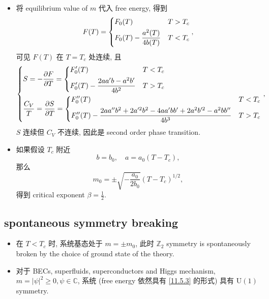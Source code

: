 \begin{itemize}
	\item 将 equilibrium value of $m$ 代入 free energy, 得到
	\begin{equation}
		F(T) = \begin{dcases}
			F_0(T) & T > T_c \\
			F_0(T) - \frac{a^2(T)}{4 b(T)} & T < T_c
		\end{dcases},
	\end{equation}
	可见 $F(T)$ 在 $T = T_c$ 处连续, 且
	\begin{equation}
		\begin{dcases}
			S = - \frac{\partial F}{\partial T} = \begin{dcases}
				F_0'(T) & T < T_c \\
				F_0'(T) - \frac{2 a a' b - a^2 b'}{4 b^2} & T > T_c
			\end{dcases} \\
			\frac{C_V}{T} = \frac{\partial S}{\partial T} = \begin{dcases}
				F_0''(T) & T < T_c \\
				F_0''(T) - \frac{2 a a'' b^2 + 2 a'^2 b^2 - 4 a a' b b' + 2 a^2 b'^2 - a^2 b b''}{4 b^3} & T > T_c
			\end{dcases}
		\end{dcases},
	\end{equation}
	$S$ 连续但 $C_V$ 不连续, 因此是 second order phase transition.
	
	\item 如果假设 $T_c$ 附近
	\begin{equation}
		b = b_0, \quad a = a_0 (T - T_c),
	\end{equation}
	 那么
	 \begin{equation}
	 	m_0 = \pm \sqrt{- \frac{a_0}{2 b_0}} (T - T_c)^{1 / 2},
	 \end{equation}
	 得到 critical exponent $\beta = \frac{1}{2}$.
\end{itemize}

\subsection{spontaneous symmetry breaking}
\begin{itemize}
	\item 在 $T < T_c$ 时, 系统基态处于 $m = \pm m_0$, 此时 $\mathbb{Z}_2$ symmetry is spontaneously broken by the choice of ground state of the theory.
	
	\item 对于 BECs, superfluids, superconductors and Higgs mechanism, $m = |\psi|^2 \geq 0, \psi \in \mathbb{C}$, 系统 (free energy 依然具有 \eqref{11.5.3} 的形式) 具有 $\mathrm{U}(1)$ symmetry.
\end{itemize}


